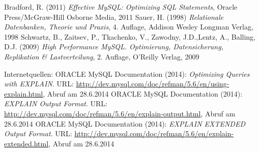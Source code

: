 \newpage
{}
  \begin{thebibliography}{}



     Bradford, R. (2011) {\sl Effective MySQL: Optimizing SQL Statements}, Oracle Press/McGraw-Hill Osborne Media, 2011
     Sauer, H. (1998) {\sl Relationale Datenbanken, Theorie und Praxis}, 4. Auflage, Addison Wesley Longman Verlag, 1998
     Schwartz, B., Zaitsev, P., Tkachenko, V., Zawodny, J.D.,Lentz, A., Balling, D.J. (2009) 
        {\sl High Performance MySQL. Optimierung, Datensicherung, Replikation \& Lastverteilung}, 2. Auflage,  O'Reilly Verlag, 2009
	
	Internetquellen:
	ORACLE MySQL Documentation (2014): {\sl Optimizing Queries with EXPLAIN}. URL: 
	\url{http://dev.mysql.com/doc/refman/5.6/en/using-explain.html}, Abruf am 28.6.2014
    ORACLE MySQL Documentation (2014): {\sl EXPLAIN Output Format}. URL: \url{http://dev.mysql.com/doc/refman/5.6/en/explain-output.html}, Abruf am 28.6.2014
	ORACLE MySQL Documentation (2014): {\sl EXPLAIN EXTENDED Output Format}. URL:
	\url{http://dev.mysql.com/doc/refman/5.6/en/explain-extended.html}, Abruf am 28.6.2014

  \end{thebibliography}
